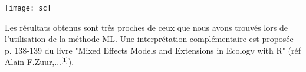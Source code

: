 \documentclass[12pt,fleqn]{book} %
\begin{document}
\vspace{2em}


\vspace{4em}

\texttt{[image: sc]}

\vspace{2em}

Les résultats obtenus sont très proches de ceux que nous avons trouvés lors de l'utilisation de la méthode ML. Une interprétation complémentaire est proposée p. 138-139 du livre "Mixed Effects Models and Extensions in Ecology with R" (réf Alain F.Zuur,...$^{\textbf{[1]}}$).



\end{document}
